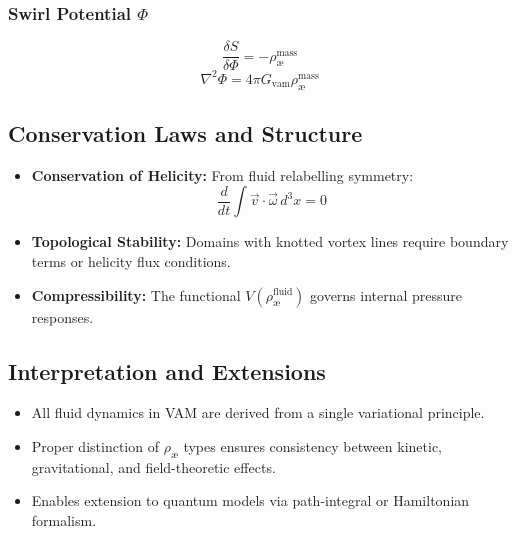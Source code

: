 \subsubsection{Swirl Potential \( \Phi \)}
\begin{equation}
    \frac{\delta S}{\delta \Phi} = -\rho_\text{\ae}^{\text{mass}}
\end{equation}
\begin{equation}
    \nabla^2 \Phi = 4\pi G_{\mathrm{vam}} \rho_\text{\ae}^{\text{mass}}
\end{equation}

\subsection{Conservation Laws and Structure}
\begin{itemize}
    \item \textbf{Conservation of Helicity:} From fluid relabelling symmetry:
    \[
        \frac{d}{dt} \int \vec{v} \cdot \vec{\omega} \, d^3x = 0
    \]
    \item \textbf{Topological Stability:} Domains with knotted vortex lines require boundary terms or helicity flux conditions.
    \item \textbf{Compressibility:} The functional \( V(\rho_\text{\ae}^{\text{fluid}}) \) governs internal pressure responses.
\end{itemize}

\subsection*{Interpretation and Extensions}
\begin{itemize}
    \item All fluid dynamics in VAM are derived from a single variational principle.
    \item Proper distinction of \( \rho_\text{\ae} \) types ensures consistency between kinetic, gravitational, and field-theoretic effects.
    \item Enables extension to quantum models via path-integral or Hamiltonian formalism.
\end{itemize}
